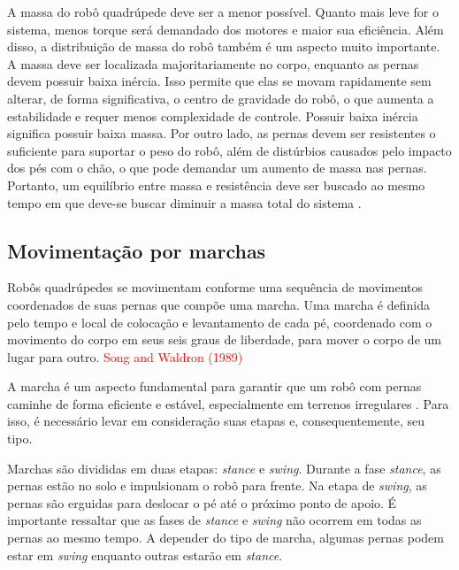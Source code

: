 \documentclass[../main.tex]{subfiles}
\begin{document}
A massa do robô quadrúpede deve ser a menor possível. Quanto mais leve for o sistema, menos torque será demandado dos motores e maior sua eficiência. Além disso, a distribuição de massa do robô também é um aspecto muito importante. A massa deve ser localizada majoritariamente no corpo, enquanto as pernas devem possuir baixa inércia. Isso permite que elas se movam rapidamente sem alterar, de forma significativa, o centro de gravidade do robô, o que aumenta a estabilidade e requer menos complexidade de controle. Possuir baixa inércia significa possuir baixa massa. Por outro lado, as pernas devem ser resistentes o suficiente para suportar o peso do robô, além de distúrbios causados pelo impacto dos pés com o chão, o que pode demandar um aumento de massa nas pernas. Portanto, um equilíbrio entre massa e resistência deve ser buscado ao mesmo tempo em que deve-se buscar diminuir a massa total do sistema \cite{Zhong2019}.

\subsection{Movimentação por marchas}
Robôs quadrúpedes se movimentam conforme uma sequência de movimentos coordenados de suas pernas que compõe uma marcha. Uma marcha é definida pelo tempo e local de colocação e levantamento de cada pé, coordenado com o movimento do corpo em seus seis graus de liberdade, para mover o corpo de um lugar para outro. \textcolor{red}{Song and Waldron (1989)}

A marcha é um aspecto fundamental para garantir que um robô com pernas caminhe de forma eficiente e estável, especialmente em terrenos irregulares \cite{X.129}. Para isso, é necessário levar em consideração suas etapas e, consequentemente, seu tipo.

Marchas são divididas em duas etapas: \textit{stance} e \textit{swing}. Durante a fase \textit{stance}, as pernas estão no solo e impulsionam o robô para frente. Na etapa de \textit{swing}, as pernas são erguidas para deslocar o pé até o próximo ponto de apoio. É importante ressaltar que as fases de \textit{stance} e \textit{swing} não ocorrem em todas as pernas ao mesmo tempo. A depender do tipo de marcha, algumas pernas podem estar em \textit{swing} enquanto outras estarão em \textit{stance}.
\end{document}

